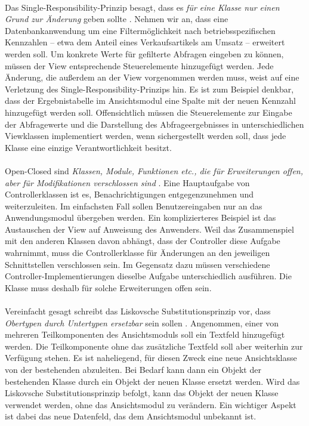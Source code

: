 \documentclass{article}
\begin{document}
\paragraph{}
Das Single-Responsibility-Prinzip besagt, dass es \textit{für eine Klasse nur einen Grund zur Änderung} geben sollte \autocite[S.~95]{Marti13}. Nehmen wir an, dass eine Datenbankanwendung um eine Filtermöglichkeit nach betriebsspezifischen Kennzahlen -- etwa dem Anteil eines Verkaufsartikels am Umsatz -- erweitert werden soll. Um konkrete Werte für gefilterte Abfragen eingeben zu können, müssen der View entsprechende Steuerelemente hinzugefügt werden. Jede Änderung, die außerdem an der View vorgenommen werden muss, weist auf eine Verletzung des Single-Responsibility-Prinzips hin. Es ist zum Beispiel denkbar, dass der Ergebnistabelle im Ansichtsmodul eine Spalte mit der neuen Kennzahl hinzugefügt werden soll. Offensichtlich müssen die Steuerelemente zur Eingabe der Abfragewerte und die Darstellung des Abfrageergebnisses in unterschiedlichen Viewklassen implementiert werden, wenn sichergestellt werden soll, dass jede Klasse eine einzige Verantwortlichkeit besitzt.
\paragraph{}
Open-Closed sind \textit{Klassen, Module, Funktionen etc., die für Erweiterungen offen, aber für Modifikationen verschlossen sind} \autocite[S.~99]{Marti13}. Eine Hauptaufgabe von Controllerklassen ist es, Benachrichtigungen entgegenzunehmen und weiterzuleiten. Im einfachsten Fall sollen Benutzereingaben nur an das Anwendungsmodul übergeben werden. Ein komplizierteres Beispiel ist das Austauschen der View auf Anweisung des Anwenders. Weil das Zusammenspiel mit den anderen Klassen davon abhängt, dass der Controller diese Aufgabe wahrnimmt, muss die Controllerklasse für Änderungen an den jeweiligen Schnittstellen verschlossen sein. Im Gegensatz dazu müssen verschiedene Controller-Implementierungen dieselbe Aufgabe unterschiedlich ausführen. Die Klasse muss deshalb für solche Erweiterungen offen sein.
\paragraph{}
Vereinfacht gesagt schreibt das Liskovsche Substitutionsprinzip vor, dass \textit{Obertypen durch Untertypen ersetzbar} sein sollen \autocite[S.~111]{Marti13}. Angenommen, einer von mehreren Teilkomponenten des Ansichtsmoduls soll ein Textfeld hinzugefügt werden. Die Teilkomponente ohne das zusätzliche Textfeld soll aber weiterhin zur Verfügung stehen. Es ist naheliegend, für diesen Zweck eine neue Ansichtsklasse von der bestehenden abzuleiten. Bei Bedarf kann dann ein Objekt der bestehenden Klasse durch ein Objekt der neuen Klasse ersetzt werden. Wird das Liskovsche Substitutionsprinzip befolgt, kann das Objekt der neuen Klasse verwendet werden, ohne das Ansichtsmodul zu verändern. Ein wichtiger Aspekt ist dabei das neue Datenfeld, das dem Ansichtsmodul unbekannt ist.
\end{document}
